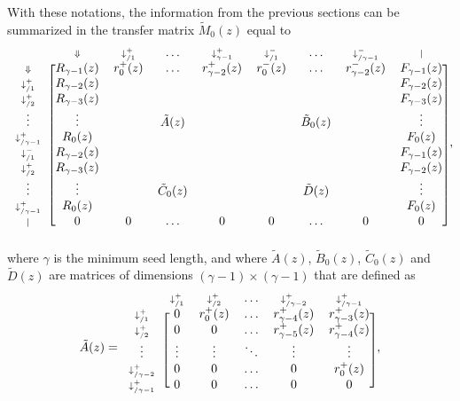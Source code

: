 \documentclass{article}
\begin{document}
With these notations, the information from the previous sections can be
summarized in the transfer matrix $\tilde{M}_0(z)$ equal to
\begin{equation*}
\begin{blockarray}{ccccccccc}
   & \scriptstyle{\Downarrow} & \scriptstyle{\downarrow_{/1}^+} & 
    \ldots & \scriptstyle{\downarrow_{\gamma-1}^+} &
    \scriptstyle{\downarrow_{/1}^-} & \ldots &
    \scriptstyle{\downarrow_{/\gamma-1}^-} & \scriptstyle{|} \\
\begin{block}{c[cccccccc]}
\scriptstyle{\Downarrow} & R_{\gamma-1}(z)  & r_0^+(z) & \ldots &
    r_{\gamma-2}^+(z) & r_0^-(z) & \ldots & r_{\gamma-2}^-(z) &
    F_{\gamma-1}(z) \\
\scriptstyle{\downarrow_{/1}^+} & R_{\gamma-2}(z) & & & & & & &
    F_{\gamma-2}(z) \\
\scriptstyle{\downarrow_{/2}^+} & R_{\gamma-3}(z) & & & & & & &
    F_{\gamma-3}(z) \\
\vdots & \vdots & & \tilde{A}(z) & & & \tilde{B}_0(z) & & \vdots \\
\scriptstyle{\downarrow_{/\gamma-1}^+} & R_0(z) & & & & & & & F_0(z) \\
\scriptstyle{\downarrow_{/1}^-} & R_{\gamma-2}(z) & & & & & & &
    F_{\gamma-1}(z) \\
\scriptstyle{\downarrow_{/2}^+} & R_{\gamma-3}(z) & & & & & & &
    F_{\gamma-2}(z) \\
\vdots & \vdots & & \tilde{C}_0(z) & & & \tilde{D}(z) & & \vdots \\
\scriptstyle{\downarrow_{/\gamma-1}^+} & R_0(z) & & & & & & & F_0(z) \\
\scriptstyle{|} & 0 & 0 & \ldots & 0 & 0 & \ldots & 0 & 0 \\
\end{block}
\end{blockarray},
\end{equation*}
where $\gamma$ is the minimum seed length, and where $\tilde{A}(z)$,
$\tilde{B}_0(z)$, $\tilde{C}_0(z)$ and $\tilde{D}(z)$ are matrices of
dimensions $(\gamma-1) \times (\gamma-1)$ that are defined as
\begin{equation*}
\tilde{A}(z) = 
\begin{blockarray}{cccccc}
   & \scriptstyle{\downarrow_{/1}^+} & \scriptstyle{\downarrow_{/2}^+} &
    \ldots & \scriptstyle{\downarrow_{/\gamma-2}^+} &
    \scriptstyle{\downarrow_{/\gamma-1}^+} \\
\begin{block}{c[ccccc]}
\scriptstyle{\downarrow_{/1}^+} & 0 & r_0^+(z) & \ldots &
    r_{\gamma-4}^+(z) & r_{\gamma-3}^+(z) \\
\scriptstyle{\downarrow_{/2}^+} & 0 & 0 & \ldots &
    r_{\gamma-5}^+(z) & r_{\gamma-4}^+(z) \\
\vdots & \vdots & \vdots & \ddots & \vdots & \vdots \\
\scriptstyle{\downarrow_{/\gamma-2}^+} & 0 & 0 & \ldots & 0 & r_0^+(z) \\
\scriptstyle{\downarrow_{/\gamma-1}^+} & 0 & 0 & \ldots & 0 & 0 \\
\end{block}
\end{blockarray},
\end{equation*}
\end{document}
